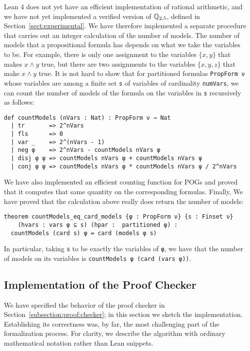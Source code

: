 Lean 4 does not yet have an efficient implementation of rational arithmetic, and
we have not yet implemented a verified version of $\mathbb{Q}_{2,5}$,
defined in Section~\ref{sect:experimental}.
We have therefore implemented a separate procedure that carries out an integer
calculation of the number of models.
The number of models that a propositional formula has depends on what we take the
variables to be. For example, there is only one assignment to the variables
$\{ x, y \}$ that makes $x \wedge y$ true, but there are two assignments to the
variables $\{ x, y, z \}$ that make $x \wedge y$ true.
It is not hard to show that for partitioned formulas \lstinline{PropForm ν} whose
variables are among a finite set \lstinline{s} of variables of cardinality \lstinline{numVars},
we can count the number of models of the formula on the variables in \lstinline{s}
recursively as follows:
\begin{lstlisting}
def countModels (nVars : Nat) : PropForm ν → Nat
  | tr       => 2^nVars
  | fls      => 0
  | var _    => 2^(nVars - 1)
  | neg φ    => 2^nVars - countModels nVars φ
  | disj φ ψ => countModels nVars φ + countModels nVars ψ
  | conj φ ψ => countModels nVars φ * countModels nVars ψ / 2^nVars
\end{lstlisting}
We have also implemented an efficient counting function for POGs and proved that
it computes that same quantity on the corresponding formulas.
Finally,
We have proved that the calculation above really does
return the number of models:
\begin{lstlisting}
theorem countModels_eq_card_models {φ : PropForm ν} {s : Finset ν}
    (hvars : vars φ ⊆ s) (hpar :  partitioned φ) :
  countModels (card s) φ = card (models φ s)
\end{lstlisting}
In particular, taking \lstinline{s} to be exactly the variables of \lstinline{φ},
we have that the number of models on its variables is \lstinline{countModels φ (card (vars φ))}.

\subsection{Implementation of the Proof Checker}

We have specified the behavior of the proof checker in Section~\ref{subsection:proof:checker};
in this section we sketch the implementation.
Establishing its correctness was, by far, the most challenging part of the formalization
process.
For clarity, we describe the algorithm with ordinary mathematical notation rather than
Lean snippets.

